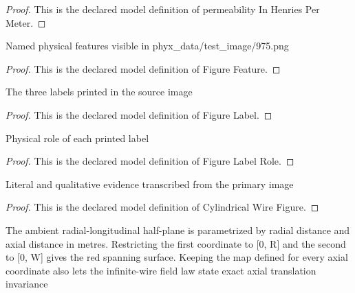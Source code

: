 \begin{proof}
  This is the declared model definition of permeability In Henries Per Meter.
\end{proof}
\begin{definition}
  \label{def:physics:phyx-mini-0975:phyxminiproblems-problemphyxmini0975-figurefeature}
  Named physical features visible in phyx\_data/test\_image/975.png
\end{definition}
\begin{proof}
  This is the declared model definition of Figure Feature.
\end{proof}
\begin{definition}
  \label{def:physics:phyx-mini-0975:phyxminiproblems-problemphyxmini0975-figurelabel}
  The three labels printed in the source image
\end{definition}
\begin{proof}
  This is the declared model definition of Figure Label.
\end{proof}
\begin{definition}
  \label{def:physics:phyx-mini-0975:phyxminiproblems-problemphyxmini0975-figurelabelrole}
  Physical role of each printed label
\end{definition}
\begin{proof}
  This is the declared model definition of Figure Label Role.
\end{proof}
\begin{definition}
  \label{def:physics:phyx-mini-0975:phyxminiproblems-problemphyxmini0975-cylindricalwirefigure}
  Literal and qualitative evidence transcribed from the primary image
\end{definition}
\begin{proof}
  This is the declared model definition of Cylindrical Wire Figure.
\end{proof}
\begin{definition}
  \label{def:physics:phyx-mini-0975:phyxminiproblems-problemphyxmini0975-radiallongitudinalrectangle}
  The ambient radial-longitudinal half-plane is parametrized by radial distance and axial distance in metres. Restricting the first coordinate to [0, R] and the second to [0, W] gives the red spanning surface. Keeping the map defined for every axial coordinate also lets the infinite-wire field law state exact axial translation invariance
\end{definition}
